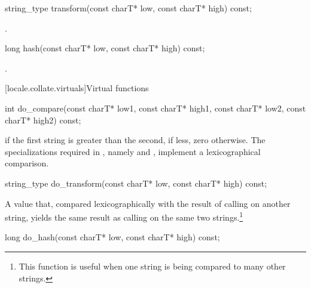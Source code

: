 %
\begin{itemdecl}
string_type transform(const charT* low, const charT* high) const;
\end{itemdecl}

\begin{itemdescr}
\pnum
\returns
{}.
\end{itemdescr}

%
\begin{itemdecl}
long hash(const charT* low, const charT* high) const;
\end{itemdecl}

\begin{itemdescr}
\pnum
\returns
{}.
\end{itemdescr}

[locale.collate.virtuals]{Virtual functions}

%
\begin{itemdecl}
int do_compare(const charT* low1, const charT* high1,
               const charT* low2, const charT* high2) const;
\end{itemdecl}

\begin{itemdescr}
\pnum
\returns
{}
if the first string is greater than the second,
if less, zero otherwise.
The specializations required in , namely
and
,
implement
a lexicographical comparison.
\end{itemdescr}

%
\begin{itemdecl}
string_type do_transform(const charT* low, const charT* high) const;
\end{itemdecl}

\begin{itemdescr}
\pnum
\returns
A
value that, compared lexicographically with the result of calling
on another string, yields the same result as calling
on the same two strings.\footnote{This function is useful when one string is
being compared to many other strings.}
\end{itemdescr}

%
\begin{itemdecl}
long do_hash(const charT* low, const charT* high) const;
\end{itemdecl}

